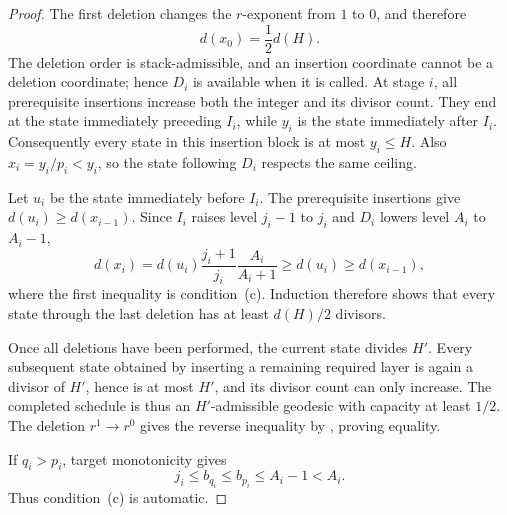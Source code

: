 \documentclass[10pt,a4paper]{amsart}
\begin{document}
\begin{proof}
The first deletion changes the $r$-exponent from $1$ to $0$, and therefore
\[
 d(x_0)=\frac12d(H).
\]
The deletion order is stack-admissible, and an insertion coordinate cannot be a deletion coordinate; hence $D_i$ is available when it is called.  At stage $i$, all prerequisite insertions increase both the integer and its divisor count.  They end at the state immediately preceding $I_i$, while $y_i$ is the state immediately after $I_i$.  Consequently every state in this insertion block is at most $y_i\le H$.  Also $x_i=y_i/p_i<y_i$, so the state following $D_i$ respects the same ceiling.

Let $u_i$ be the state immediately before $I_i$.  The prerequisite insertions give $d(u_i)\ge d(x_{i-1})$.  Since $I_i$ raises level $j_i-1$ to $j_i$ and $D_i$ lowers level $A_i$ to $A_i-1$,
\[
 d(x_i)
 =d(u_i)\frac{j_i+1}{j_i}\frac{A_i}{A_i+1}
 \ge d(u_i)
 \ge d(x_{i-1}),
\]
where the first inequality is condition~\textup{(c)}.  Induction therefore shows that every state through the last deletion has at least $d(H)/2$ divisors.

Once all deletions have been performed, the current state divides $H'$.  Every subsequent state obtained by inserting a remaining required layer is again a divisor of $H'$, hence is at most $H'$, and its divisor count can only increase.  The completed schedule is thus an $H'$-admissible geodesic with capacity at least $1/2$.  The deletion $r^1\to r^0$ gives the reverse inequality by , proving equality.

If $q_i>p_i$, target monotonicity gives
\[
 j_i\le b_{q_i}\le b_{p_i}\le A_i-1<A_i.
\]
Thus condition~\textup{(c)} is automatic.
\end{proof}
\end{document}
